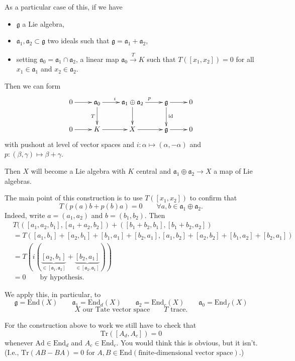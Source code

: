 \noindent
As a particular case of this,
if we have
\begin{itemize}
\item $\mathfrak{g}$ a Lie algebra,
\item $\mathfrak{a}_1, \mathfrak{a}_2 \subset
\mathfrak{g}$
two ideals such that
$\mathfrak{g}=\mathfrak{a}_1 +
\mathfrak{a}_2$,
\item setting $\mathfrak{a}_0=\mathfrak{a}_1
\cap \mathfrak{a}_2$,
a linear map $\mathfrak{a}_0
\xrightarrow{T}K$
such that $T([x_1,x_2])=0$ for all
$x_1 \in \mathfrak{a}_1$ and $x_2 \in
\mathfrak{a}_2$.
\end{itemize}

\noindent
Then we can form
$$
\xymatrix{
0\ar[r]&\mathfrak{a}_0\ar[d]_T\ar[r]^i
&\mathfrak{a}_1 \oplus
\mathfrak{a}_2\ar[d]\ar[r]^p
&\mathfrak{g}\ar[r]\ar[d]^{\text{id}}&0\\
0\ar[r]& K\ar[r]&
X\ar[r]&\mathfrak{g}\ar[r]&0
}
$$
\noindent
with pushout at level of vector spaces
and $i:\alpha \mapsto (\alpha,-\alpha)$
and $p:(\beta,\gamma)\mapsto \beta+\gamma$.

\begin{exercise}
\label{exercise-central-extension-duplicate-2}
Then $X$ will become a Lie algebra
with $K$ central and
$\mathfrak{a}_1 \oplus \mathfrak{a}_2 \to X$
a map of Lie algebras.
\end{exercise}

\noindent
The main point of this construction
is to use $T([x_1,x_2])$
to confirm that
$$
T(p(a)b+p(b)a)=0\qquad \forall a,b \in
\mathfrak{a}_1 \oplus \mathfrak{a}_2.
$$
Indeed, write $a=(a_1,a_2)$ and
$b=(b_1,b_2)$.
Then
$$
\begin{aligned}
&T(([a_1,a_2,b_1],[a_1+a_2,b_2])+([b_1+b_2,
b_1],[b_1+b_2,a_2])\\
&=T([a_1,b_1]+[a_2,b_1]+[b_1,a_1]+[b_2,a_1],
[a_1,b_2]+[a_2,b_2]+[b_1,a_2]+[b_2,a_1])\\
&=T(i(\underbrace{[a_2,b_1]}
_{\in[\mathfrak{a}_1,\mathfrak{a}_2]}+
\underbrace{[b_2,a_1]}_{\in[\mathfrak{a}_2,
\mathfrak{a}_1]}))\\
&=0\qquad \text{by hypothesis.}
\end{aligned}
$$

\medskip\noindent
We apply this, in particular, to
$$
\mathfrak{g}=\text{End}(X)
\qquad \mathfrak{a}_1=\text{End}_d(X)
\qquad \mathfrak{a}_2=\text{End}_c(X)
\qquad \mathfrak{a}_0=\text{End}_f(X)
$$
$$
X \text{ our Tate vector space}\qquad
T \text{ trace}.
$$

\noindent
For the construction above to work
we still have to check that
$$
\text{Tr}([A_d,A_c])=0
$$
whenever $\text{Ad} \in \text{End}_d$ and
$A_c \in \text{End}_c$.
You would think this is obvious,
but it isn't.
(I.e., $\text{Tr}(AB-BA)=0$ for $A,B \in
\text{End}(\text{finite-dimensional
vector space})$.)

